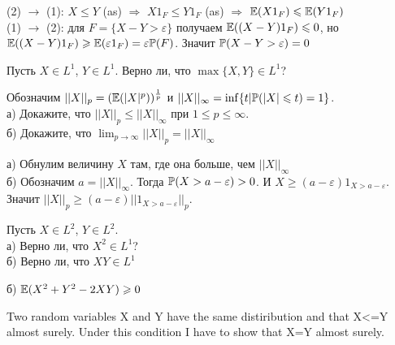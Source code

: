 \begin{solution}
\begin{solution}
\begin{solution}
\begin{solution}
\begin{solution}
\begin{solution}
(2) $\rightarrow$ (1): $X\le Y$ (as) $\Rightarrow$ $X 1_{F}\le Y
1_{F}$ (as) $\Rightarrow$ $\E(X 1_{F})\le \E(Y 1_{F})$ \\
(1) $\rightarrow$ (2): для $F=\{X-Y>\varepsilon\}$ получаем
$\E((X-Y) 1_{F})\le
 0$, но $\E((X-Y) 1_{F})\ge \E(\varepsilon 1_{F})=\varepsilon \P(F)$.
Значит $\P(X-Y>\varepsilon)=0$ 
\end{solution}

\begin{problem}
Пусть $X\in L^{1}$, $Y\in L^{1}$. Верно ли, что $\max\{X,Y\}\in
L^{1}$? 
\end{problem} 
\begin{solution} 

\end{solution}

\begin{problem}
\label{L beskonechnost} Обозначим
$||X||_{p}=(\E(|X|^{p}))^{\frac{1}{p}}$ и
$||X||_{\infty}=\inf\{t|\P(|X|\le t)=1\}$. \\
а) Докажите, что $||X||_{p}\le ||X||_{\infty}$ при $1\le p\le
\infty$. \\
б) Докажите, что $\lim_{p\to\infty}||X||_{p}=||X||_{\infty}$ 
\end{problem} 
\begin{solution} 

а) Обнулим величину $X$ там, где она больше, чем $||X||_{\infty}$ \\
б) Обозначим $a=||X||_{\infty}$. Тогда $\P(X>a-\varepsilon)>0$. И
$X\ge (a-\varepsilon)1_{X>a-\varepsilon}$. Значит $||X||_{p}\ge
(a-\varepsilon)||1_{X>a-\varepsilon}||_{p}$. 
\end{solution}

\begin{problem}
\label{X2Y2XY} Пусть $X\in L^{2}$, $Y\in L^{2}$. \\
а) Верно ли, что $X^{2}\in L^{1}$? \\
б) Верно ли, что $XY\in L^{1}$ 
\end{problem} 
\begin{solution} 

б) $\E(X^{2}+Y^{2}-2XY)\ge 0$ 
\end{solution}

\begin{problem}
Two random variables X and Y have the same distiribution and that X<=Y almost surely. 
Under this condition I have to show that X=Y almost surely. 
\end{problem} 
\begin{solution} 


\end{solution}
\end{solution}
\end{solution}
\end{solution}
\end{solution}
\end{solution}
